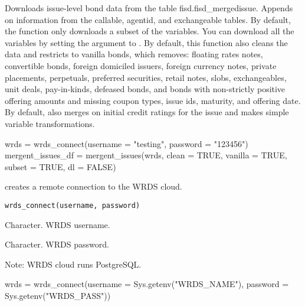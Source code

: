 \documentclass[a4paper]{book}
\begin{document}
%
\begin{Details}\relax
Downloads issue-level bond data from the table fisd.fisd\_mergedissue. Appends on information
from the callable, agentid, and exchangeable tables. By default, the function only downloads a
subset of the variables. You can download all the variables by setting the 
argument to . By default, this function also cleans the data and restricts to
vanilla bonds, which removes: floating rates notes, convertible bonds, foreign domiciled
issuers, foreign currency notes, private placements, perpetuals, preferred securities,
retail notes, slobs, exchangeables, unit deals, pay-in-kinds, defeased bonds, and bonds with
non-strictly positive offering amounts and missing coupon types, issue ids, maturity, and
offering date. By default, also merges on initial credit ratings for the issue and makes
simple variable transformations.
\end{Details}
%
\begin{Examples}
\begin{ExampleCode}
wrds = wrds_connect(username = "testing", password = "123456")
mergent_issues_df = mergent_issues(wrds, clean = TRUE, vanilla = TRUE, subset = TRUE, dl = FALSE)
\end{ExampleCode}
\end{Examples}
%
\begin{Description}\relax
{} creates a remote connection to the WRDS cloud.
\end{Description}
%
\begin{Usage}
\begin{verbatim}
wrds_connect(username, password)
\end{verbatim}
\end{Usage}
%
\begin{Arguments}
\begin{ldescription}
\item[\code{username}] Character. WRDS username.

\item[\code{password}] Character. WRDS password.
\end{ldescription}
\end{Arguments}
%
\begin{Details}\relax
Note: WRDS cloud runs PostgreSQL.
\end{Details}
%
\begin{Examples}
\begin{ExampleCode}
wrds = wrds_connect(username = Sys.getenv("WRDS_NAME"), password = Sys.getenv("WRDS_PASS"))
\end{ExampleCode}
\end{Examples}
\end{document}
